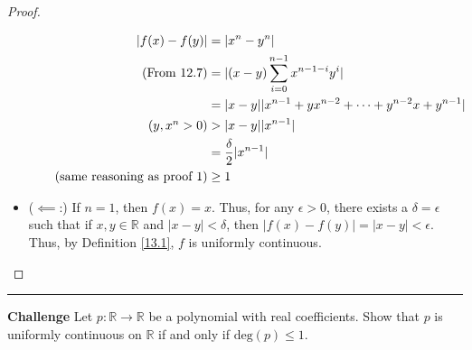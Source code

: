 \documentclass[openany, amssymb, psamsfonts]{amsart}
\newcommand{\bbR}{\mathbb{R}}
\theoremstyle{definition}
\numberwithin{equation}{section}
\begin{document}
\begin{proof}
\begin{itemize}
\begin{align*}
    |f(x) - f(y)| &= |x^n - y^n|\\
\tag{From 12.7}    &= |(x-y)\sum_{i=0}^{n-1}x^{n-1-i}y^i|\\
                    &= |x-y||x^{n-1} + yx^{n-2} + \dots + y^{n-2}x + y^{n-1}|\\
\tag{$y,x^{n}>0$}     &> |x-y||x^{n-1}|\\
                    &= \frac{\delta}{2}|x^{n-1}|\\
\tag{same reasoning as proof 1}                      &\geq 1
\end{align*}
\item ($\impliedby$:) If $n=1$, then $f(x) = x$. Thus, for any $\epsilon>0$, there exists a $\delta = \epsilon$ such that if $x,y\in \bbR$ and $|x-y|<\delta$, then $|f(x) - f(y)| = |x-y|<\epsilon$. Thus, by Definition \ref{13.1}, $f$ is uniformly continuous. 
\end{itemize}
\end{proof} \vspace{4pt}     \hrule   \vspace{4pt}

\textbf{Challenge} Let $p:\bbR\rightarrow\bbR$ be a polynomial with real coefficients.  Show that $p$ is uniformly
continuous on $\bbR$ if and only if $\mbox{deg}(p)\leq 1$.
\end{document}
